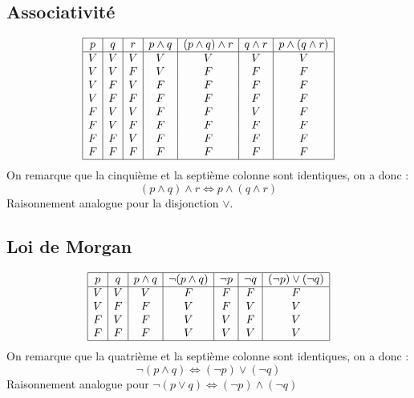 \documentclass[../main.tex]{subfiles}
\begin{document}
\subsection{Associativité}
\begin{displaymath}
    \begin{array}{|c|c|c|c|c|c|c|}
        \hline
        p & q & r & p \land q & (p \land q) \land r & q \land r & p \land (q \land r)\\ %
        \hline %
        V & V & V & V & V & V & V\\
        V & V & F & V & F & F & F\\
        V & F & V & F & F & F & F\\
        V & F & F & F & F & F & F\\
        F & V & V & F & F & V & F\\
        F & V & F & F & F & F & F\\
        F & F & V & F & F & F & F\\
        F & F & F & F & F & F & F\\
        \hline
    \end{array}
\end{displaymath}
On remarque que la cinquième et la septième colonne sont identiques, on a donc :
$$(p\land q)\land r\iff p \land (q\land r)$$
Raisonnement analogue pour la disjonction $\lor$.

\subsection{Loi de Morgan}
\begin{displaymath}
    \begin{array}{|c|c|c|c|c|c|c|}
    \hline
    p & q & p \land q & \lnot(p \land q) & \lnot p & \lnot q & (\lnot p)\lor(\lnot q)\\ %
    \hline %
    V & V & V & F & F & F & F\\
    V & F & F & V & F & V & V\\
    F & V & F & V & V & F & V\\
    F & F & F & V & V & V & V\\
    \hline
    \end{array}
\end{displaymath}
On remarque que la quatrième et la septième colonne sont identiques, on a donc :
$$\lnot (p\land q) \iff (\lnot p)\lor(\lnot q)$$
Raisonnement analogue pour $\lnot (p\lor q) \iff (\lnot p)\land(\lnot q)$
\end{document}
